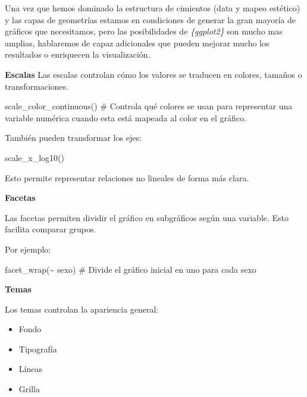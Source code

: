 \documentclass[
  letterpaper,
  DIV=11,
  numbers=noendperiod,
  oneside]{scrreprt}
\newenvironment{Shaded}{\begin{snugshade}}{\end{snugshade}}
\newcommand{\CommentTok}[1]{\textcolor[rgb]{0.37,0.37,0.37}{#1}}
\newcommand{\FunctionTok}[1]{\textcolor[rgb]{0.28,0.35,0.67}{#1}}
\newcommand{\NormalTok}[1]{\textcolor[rgb]{0.00,0.23,0.31}{#1}}
\newcommand{\SpecialCharTok}[1]{\textcolor[rgb]{0.37,0.37,0.37}{#1}}
\begin{document}
Una vez que hemos dominado la estructura de cimientos (data y mapeo
estético) y las capas de geometrías estamos en condiciones de generar la
gran mayoría de gráficos que necesitamos, pero las posibilidades de
\emph{\{ggplot2\}} son mucho mas amplias, hablaremos de capaz
adicionales que pueden mejorar mucho los resultados o enriquecen la
visualización.

\textbf{Escalas} Las escalas controlan cómo los valores se traducen en
colores, tamaños o transformaciones.

\begin{Shaded}
\begin{Highlighting}[]
\FunctionTok{scale\_color\_continuous}\NormalTok{()}
\CommentTok{\# Controla qué colores se usan para representar una variable numérica cuando esta está mapeada al color en el gráfico.}
\end{Highlighting}
\end{Shaded}

También pueden transformar los ejes:

\begin{Shaded}
\begin{Highlighting}[]
\FunctionTok{scale\_x\_log10}\NormalTok{()}
\end{Highlighting}
\end{Shaded}

Esto permite representar relaciones no lineales de forma más clara.

\textbf{Facetas}

Las facetas permiten dividir el gráfico en subgráficos según una
variable. Esto facilita comparar grupos.

Por ejemplo:

\begin{Shaded}
\begin{Highlighting}[]
\FunctionTok{facet\_wrap}\NormalTok{(}\SpecialCharTok{\textasciitilde{}}\NormalTok{ sexo)}
\CommentTok{\# Divide el gráfico inicial en uno para cada sexo}
\end{Highlighting}
\end{Shaded}

\textbf{Temas}

Los temas controlan la apariencia general:

\begin{itemize}
\item
  Fondo
\item
  Tipografía
\item
  Líneas
\item
  Grilla
\end{itemize}
\end{document}
